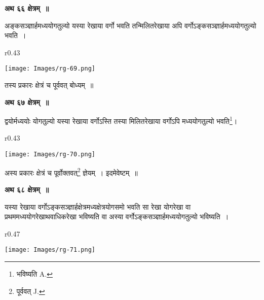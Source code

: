 \documentclass[11pt, openany]{book}
\begin{document}
\newpage
 \begin{center}
\textbf{\large अथ ६६ क्षेत्रम्~॥}
\end{center}

{\ab अङ्कसञ्ज्ञार्हमध्ययोगतुल्यो यस्या रेखाया वर्गो भवति तन्मिलितरेखाया अपि वर्गोऽङ्कसञ्ज्ञार्हमध्ययोगतुल्यो भवति~। }\\

\begin{wrapfigure}{r}{0.43\textwidth}
\vspace{-14mm}
\begin{center}
\texttt{[image: Images/rg-69.png]}
\end{center}
\vspace{-8mm}
\end{wrapfigure}

तस्य प्रकारः क्षेत्रं च पूर्ववत् बोध्यम्~॥\\
\vspace{2mm}

\begin{center}
\textbf{\large अथ ६७ क्षेत्रम्~॥}
\end{center}

{\ab द्वयोर्मध्ययोः योगतुल्यो यस्या रेखाया वर्गोऽस्ति तस्या मिलितरेखाया वर्गोऽपि मध्ययोगतुल्यो भवति\renewcommand{\thefootnote}{१}\footnote{भविष्यति {\en A.}}\;। }\\

\begin{wrapfigure}{r}{0.43\textwidth}
\vspace{-14mm}
\begin{center}
\texttt{[image: Images/rg-70.png]}
\end{center}
\vspace{-8mm}
\end{wrapfigure}

अस्य प्रकारः क्षेत्रं च पूर्वोक्तवत्\renewcommand{\thefootnote}{२}\footnote{पूर्ववत् {\en J.}} ज्ञेयम्~। इदमेवेष्टम्~॥\\

\begin{center}
\textbf{\large अथ ६८ क्षेत्रम्~॥}
\end{center}

{\ab यस्या रेखाया वर्गोऽङ्कसञ्ज्ञार्हक्षेत्रमध्यक्षेत्रयोगसमो भवति सा रेखा योगरेखा वा प्रथममध्ययोगरेखाथवाधिकरेखा भविष्यति वा अस्या वर्गोऽङ्कसञ्ज्ञार्हमध्ययोगतुल्यो
भविष्यति~।}\\ 

\begin{wrapfigure}{r}{0.47\textwidth}
\vspace{-10mm}
\begin{center}
\texttt{[image: Images/rg-71.png]}
\end{center}
\vspace{-8mm}
\end{wrapfigure}
\end{document}
